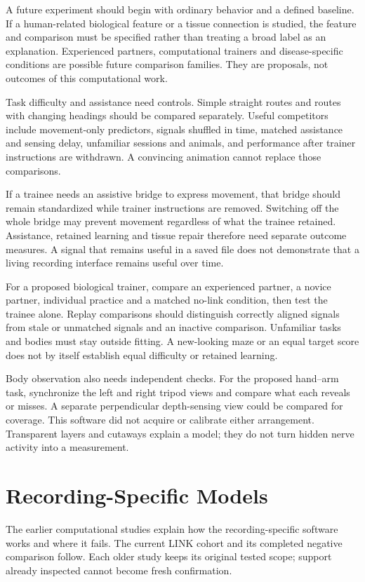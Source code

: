 A future experiment should begin with ordinary behavior and a defined baseline.
If a human-related biological feature or a tissue connection is studied, the
feature and comparison must be specified rather than treating a broad label as
an explanation. Experienced partners, computational trainers and disease-specific
conditions are possible future comparison families. They are proposals, not
outcomes of this computational work.

Task difficulty and assistance need controls. Simple straight routes and routes
with changing headings should be compared separately. Useful competitors include
movement-only predictors, signals shuffled in time, matched assistance and sensing
delay, unfamiliar sessions and animals, and performance after trainer instructions
are withdrawn. A convincing animation cannot replace those comparisons.

If a trainee needs an assistive bridge to express movement, that bridge should
remain standardized while trainer instructions are removed. Switching off the whole
bridge may prevent movement regardless of what the trainee retained. Assistance,
retained learning and tissue repair therefore need separate outcome measures.
A signal that remains useful in a saved file does not demonstrate that a living
recording interface remains useful over time.

For a proposed biological trainer, compare an experienced partner, a novice partner,
individual practice and a matched no-link condition, then test the trainee alone.
Replay comparisons should distinguish correctly aligned signals from stale or
unmatched signals and an inactive comparison. Unfamiliar tasks and bodies must
stay outside fitting. A new-looking maze or an equal target score does not by
itself establish equal difficulty or retained learning.

Body observation also needs independent checks. For the proposed hand--arm task,
synchronize the left and right tripod views and compare what each reveals or
misses. A separate perpendicular depth-sensing view could be compared for
coverage. This software did not acquire or calibrate either arrangement.
Transparent layers and cutaways explain a model; they do not turn hidden nerve
activity into a measurement.

\section{Recording-Specific Models}

The earlier computational studies explain how the recording-specific software
works and where it fails. The current LINK cohort and its completed negative
comparison follow. Each older study keeps its original tested scope; support
already inspected cannot become fresh confirmation.


